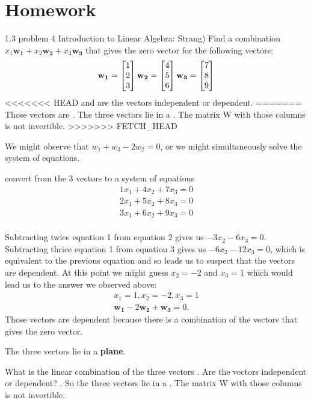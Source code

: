\documentclass{ximera}
\begin{document}
\section*{Homework}
\begin{question}
1.3 problem 4 Introduction to Linear Algebra: Strang) Find a combination $x_1\mathbf{w_1} + x_2\mathbf{w_2} + x_3\mathbf{w_3}$ that gives the zero vector for the following vectors:
\begin{align*}
\mathbf{w_1} = \begin{bmatrix}1\\2\\3\end{bmatrix} \mathbf{w_2} = \begin{bmatrix}4\\5\\6\end{bmatrix} \mathbf{w_3} = \begin{bmatrix}7\\8\\9\end{bmatrix}
\end{align*}
<<<<<<< HEAD
and are the vectors independent or dependent.
=======
Those vectors are .
The three vectors lie in a . The matrix W with those columns
is not invertible.
>>>>>>> FETCH_HEAD
\begin{solution}
\begin{hint}
We might observe that $w_1 + w_3 -2w_2 = 0$, or we might simultaneously solve the system of equations.
\end{hint}
\begin{hint}
convert from the 3 vectors to a system of equations
\begin{align*}
1x_1+4x_2+7x_3=0\\
2x_1+5x_2+8x_3=0\\
3x_1+6x_2+9x_3=0\\
\end{align*}
\end{hint}
\begin{hint}
Subtracting twice equation 1 from equation 2 gives us $-3x_2 - 6x_3 = 0$. Subtracting thrice equation 1 from equation 3 gives us $-6x_2 - 12x_3 = 0$, which is equivalent to the previous equation and so leads us to suspect that the vectors are dependent. At this point we might guess $x_2 = -2$ and $x_3 = 1$ which would lead us to the answer we observed above:
\begin{align*}
x_1 =1, x_2 =-2, x_3 =1\\
\mathbf{w_1}-2\mathbf{w_2}+\mathbf{w_3} =0.
\end{align*}
Those vectors are dependent because there is a combination of the vectors
that gives the zero vector.
\end{hint}
\begin{hint}
The three vectors lie in a \textbf{plane}.
\end{hint}
What is the linear combination of the three vectors .
Are the vectors independent or dependent?  .
So the three vectors lie in a . The matrix W with those columns
is not invertible.
\end{solution}
\end{question}
\end{document}
